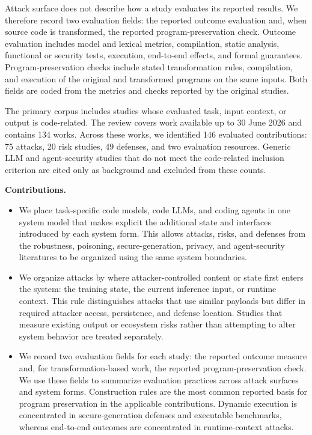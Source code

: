 \documentclass[acmsmall,screen,review]{acmart}
\begin{document}
Attack surface does not describe how a study evaluates its reported results. We therefore record two evaluation fields: the reported outcome evaluation and, when source code is transformed, the reported program-preservation check. Outcome evaluation includes model and lexical metrics, compilation, static analysis, functional or security tests, execution, end-to-end effects, and formal guarantees. Program-preservation checks include stated transformation rules, compilation, and execution of the original and transformed programs on the same inputs. Both fields are coded from the metrics and checks reported by the original studies.

The primary corpus includes studies whose evaluated task, input context, or output is code-related. The review covers work available up to 30 June 2026 and contains 134 works. Across these works, we identified 146 evaluated contributions: 75 attacks, 20 risk studies, 49 defenses, and two evaluation resources. Generic LLM and agent-security studies that do not meet the code-related inclusion criterion are cited only as background and excluded from these counts.

\noindent\textbf{Contributions.}
\begin{itemize}
\item We place task-specific code models, code LLMs, and coding agents in one system model that makes explicit the additional state and interfaces introduced by each system form. This allows attacks, risks, and defenses from the robustness, poisoning, secure-generation, privacy, and agent-security literatures to be organized using the same system boundaries.

\item We organize attacks by where attacker-controlled content or state first enters the system: the training state, the current inference input, or runtime context. This rule distinguishes attacks that use similar payloads but differ in required attacker access, persistence, and defense location. Studies that measure existing output or ecosystem risks rather than attempting to alter system behavior are treated separately.

\item We record two evaluation fields for each study: the reported outcome measure and, for transformation-based work, the reported program-preservation check. We use these fields to summarize evaluation practices across attack surfaces and system forms. Construction rules are the most common reported basis for program preservation in the applicable contributions. Dynamic execution is concentrated in secure-generation defenses and executable benchmarks, whereas end-to-end outcomes are concentrated in runtime-context attacks.
\end{itemize}
\end{document}
